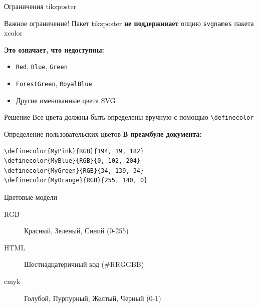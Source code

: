 \documentclass[aspectratio=169]{beamer}
\begin{document}
\begin{frame}[fragile]{Ограничения tikzposter}
    \begin{alertblock}{Важное ограничение!}
        Пакет tikzposter \textbf{не поддерживает} опцию \texttt{svgnames} пакета xcolor
    \end{alertblock}
    
    \vspace{0.3cm}
    
    \textbf{Это означает, что недоступны:}
    \begin{itemize}
        \item \texttt{Red}, \texttt{Blue}, \texttt{Green}
        \item \texttt{ForestGreen}, \texttt{RoyalBlue}
        \item Другие именованные цвета SVG
    \end{itemize}
    
    \vspace{0.3cm}
    
    \begin{block}{Решение}
        Все цвета должны быть определены вручную с помощью \texttt{\textbackslash definecolor}
    \end{block}
\end{frame}

\begin{frame}[fragile]{Определение пользовательских цветов}
    \textbf{В преамбуле документа:}
    
    \vspace{0.3cm}
    
    \begin{lstlisting}
\definecolor{MyPink}{RGB}{194, 19, 182}
\definecolor{MyBlue}{RGB}{0, 102, 204}
\definecolor{MyGreen}{RGB}{34, 139, 34}
\definecolor{MyOrange}{RGB}{255, 140, 0}
    \end{lstlisting}
    
    \vspace{0.3cm}
    
    \begin{block}{Цветовые модели}
        \begin{description}
            \item[RGB] Красный, Зеленый, Синий (0-255)
            \item[HTML] Шестнадцатеричный код (\#RRGGBB)
            \item[cmyk] Голубой, Пурпурный, Желтый, Черный (0-1)
        \end{description}
    \end{block}
\end{frame}
\end{document}
